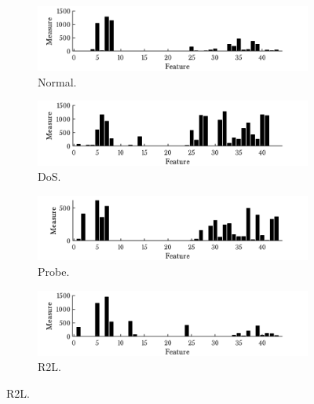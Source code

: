 \begin{figure}[h!]
        \begin{subfigure}[b]{.87\textwidth}  
            \centering 
            \includegraphics[width=.98\textwidth]{parts/chap-4/img-knn/cnn-chi2/normal.png}
            \caption{Normal.} 
        \end{subfigure}
        \vfill
        \begin{subfigure}[b]{.87\textwidth}  
            \centering 
            \includegraphics[width=.98\textwidth]{parts/chap-4/img-knn/cnn-chi2/dos.png}
            \caption{DoS.} 
        \end{subfigure}
        \vfill
        \begin{subfigure}[b]{.87\textwidth}  
            \centering 
            \includegraphics[width=.98\textwidth]{parts/chap-4/img-knn/cnn-chi2/probe.png}
            \caption{Probe.} 
        \end{subfigure}
        \vfill
        \begin{subfigure}[b]{.87\textwidth}  
            \centering 
            \includegraphics[width=.98\textwidth]{parts/chap-4/img-knn/cnn-chi2/r2l.png}
            \caption{R2L.} 

\end{subfigure}
\end{figure}
